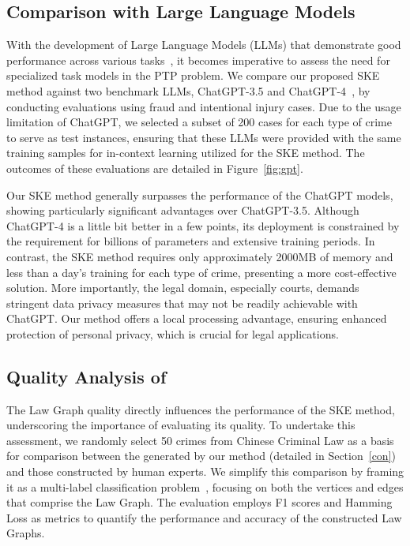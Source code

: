 \subsection{Comparison with Large Language Models}
With the development of Large Language Models (LLMs) that demonstrate good performance across various tasks~\cite{NEURIPS2020_1457c0d6,Katz2023GPT4PT, sun2023short}, it becomes imperative to assess the need for specialized task models in the PTP problem. We compare our proposed SKE method against two benchmark LLMs, ChatGPT-3.5 and ChatGPT-4~\cite{NEURIPS2022_b1efde53,DBLP:journals/corr/abs-2303-08774}, by conducting evaluations using fraud and intentional injury cases. Due to the usage limitation of ChatGPT, we selected a subset of 200 cases for each type of crime to serve as test instances, ensuring that these LLMs were provided with the same training samples for in-context learning utilized for the SKE method. The outcomes of these evaluations are detailed in Figure~\ref{fig:gpt}.

Our SKE method generally surpasses the performance of the ChatGPT models, showing particularly significant advantages over ChatGPT-3.5. Although ChatGPT-4 is a little bit better in a few points, its deployment is constrained by the requirement for billions of parameters and extensive training periods. In contrast, the SKE method requires only approximately 2000MB of memory and less than a day's training for each type of crime, presenting a more cost-effective solution. More importantly, the legal domain, especially courts, demands stringent data privacy measures that may not be readily achievable with ChatGPT. Our method offers a local processing advantage, ensuring enhanced protection of personal privacy, which is crucial for legal applications.


\subsection{Quality Analysis of }
The Law Graph quality directly influences the performance of the SKE method, underscoring the importance of evaluating its quality. To undertake this assessment, we randomly select 50 crimes from Chinese Criminal Law as a basis for comparison between the \lawgraph{} generated by our method (detailed in Section~\ref{con}) and those constructed by human experts. We simplify this comparison by framing it as a multi-label classification problem~\cite{6471714}, focusing on both the vertices and edges that comprise the Law Graph. The evaluation employs F1 scores and Hamming Loss as metrics to quantify the performance and accuracy of the constructed Law Graphs.

